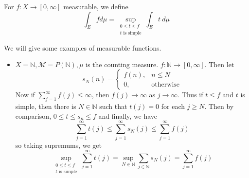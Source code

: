 \begin{definition}
  For $f: X \to [0, \infty]$ measurable, we define \[
    \int_E f d \mu = \sup_{\substack{ 0\le t\le f \\ t \textrm{ is simple}}} \int_E t \ d \mu
  \]
\end{definition}
\begin{example}
  We will give some examples of measurable functions.
  \begin{itemize}[]
    \item $X = \mathbb{N}, \mathcal{M} = P(\mathbb{N}), \mu$ is the counting measure. $f: \mathbb{N} \to [0, \infty]$. Then let \[
        s_N(n) = \begin{cases}
          f(n), & n \le N \\ 
          0, &\textrm{otherwise}
        \end{cases}
    \]
      Now if $\sum_{j = 1}^{\infty} f(j) \le \infty$, then $f(j) \to \infty$ as $j \to \infty$. Thus if $t \le f$ and $t$ is simple, then there is $ N \in \mathbb{N}$ such that $t(j) = 0$ for each $ j \ge N$. Then by comparison, $0 \le t \le s_n \le f$ and finally, we have \[
        \sum_{j = 1}^{\infty}  t(j) \le \sum_{ j = 1}^{\infty}  s_N(j) \le \sum_{ j = 1}^{\infty}  f(j)
      \]
      so taking supremums, we get \[
        \sup_{\substack{0\le t \le f\\ t \textrm{ is simple}}}  \sum_{j = 1}^{\infty}  t(j) = \sup_{N \in \mathbb{N}}\sum_{ j \in \mathbb{N}} s_N(j) = \sum_{ j = 1}^{\infty}  f(j)
      \]
  \end{itemize}
\end{example}

























